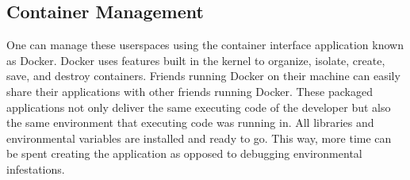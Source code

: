 \documentclass{article}
\begin{document}
\subsection{Container Management}
One can manage these userspaces using the container interface application known as Docker. Docker uses features built in the kernel to organize, isolate, create, save, and destroy containers. Friends running Docker on their machine can easily share their applications with other friends running Docker. These packaged applications not only deliver the same executing code of the developer but also the same environment that executing code was running in. All libraries and environmental variables are installed and ready to go. This way, more time can be spent creating the application as opposed to debugging environmental infestations.
\end{document}
